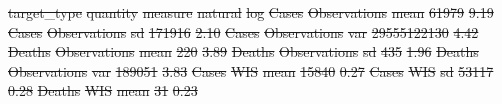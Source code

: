 \documentclass{article}
\providecommand{\DIFdeltex}[1]{{\protect\color{red}\sout{#1}}}                      %
\providecommand{\DIFdelFL}[1]{\DIFdel{#1}} %
\providecommand{\DIFdel}[1]{\texorpdfstring{\DIFdeltex{#1}}{}} %
\begin{document}
\DIFdelFL{target\_type }%
\DIFdelFL{quantity }%
\DIFdelFL{measure }%
\DIFdelFL{natural }%
\DIFdelFL{log}%
\DIFdelFL{Cases }%
\DIFdelFL{Observations }%
\DIFdelFL{mean }%
\DIFdelFL{61979 }%
\DIFdelFL{9.19}%
\DIFdelFL{Cases }%
\DIFdelFL{Observations }%
\DIFdelFL{sd }%
\DIFdelFL{171916 }%
\DIFdelFL{2.10}%
\DIFdelFL{Cases }%
\DIFdelFL{Observations }%
\DIFdelFL{var }%
\DIFdelFL{29555122130 }%
\DIFdelFL{4.42}%
\DIFdelFL{Deaths }%
\DIFdelFL{Observations }%
\DIFdelFL{mean }%
\DIFdelFL{220 }%
\DIFdelFL{3.89}%
\DIFdelFL{Deaths }%
\DIFdelFL{Observations }%
\DIFdelFL{sd }%
\DIFdelFL{435 }%
\DIFdelFL{1.96}%
\DIFdelFL{Deaths }%
\DIFdelFL{Observations }%
\DIFdelFL{var }%
\DIFdelFL{189051 }%
\DIFdelFL{3.83}%
\DIFdelFL{Cases }%
\DIFdelFL{WIS }%
\DIFdelFL{mean }%
\DIFdelFL{15840 }%
\DIFdelFL{0.27}%
\DIFdelFL{Cases }%
\DIFdelFL{WIS }%
\DIFdelFL{sd }%
\DIFdelFL{53117 }%
\DIFdelFL{0.28}%
\DIFdelFL{Deaths }%
\DIFdelFL{WIS }%
\DIFdelFL{mean }%
\DIFdelFL{31 }%
\DIFdelFL{0.23}%
\end{document}
